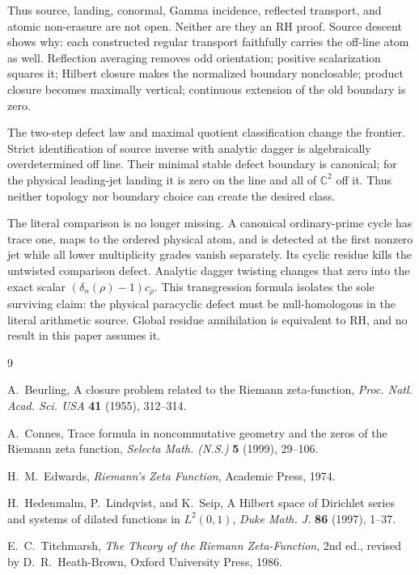 \documentclass[11pt]{article}
\theoremstyle{definition}
\theoremstyle{remark}
\newcommand{\C}{\mathbb C}
\begin{document}
Thus source, landing, conormal, Gamma incidence, reflected transport, and
atomic non-erasure are not open.  Neither are they an RH proof.  Source
descent shows why: each constructed regular transport faithfully carries the
off-line atom as well.  Reflection averaging removes odd orientation;
positive scalarization squares it; Hilbert closure makes the normalized
boundary nonclosable; product closure becomes maximally vertical; continuous
extension of the old boundary is zero.

The two-step defect law and maximal quotient classification change the
frontier.  Strict identification of source inverse with analytic dagger is
algebraically overdetermined off line.  Their minimal stable defect boundary
is canonical; for the physical leading-jet landing it is zero on the line and
all of \(\C^2\) off it.  Thus neither topology nor boundary choice can create
the desired class.

The literal comparison is no longer missing.  A canonical ordinary-prime
cycle has trace one, maps to the ordered physical atom, and is detected at
the first nonzero jet while all lower multiplicity grades vanish separately.
Its cyclic residue kills the untwisted comparison defect.  Analytic dagger
twisting changes that zero into the exact scalar
\((\delta_n(\rho)-1)c_\rho\).  This transgression formula isolates the sole
surviving claim: the physical paracyclic defect must be null-homologous in
the literal arithmetic source.  Global residue annihilation is equivalent to
RH, and no result in this paper assumes it.

\begin{thebibliography}{9}

A.~Beurling,
\newblock A closure problem related to the Riemann zeta-function,
\newblock \emph{Proc. Natl. Acad. Sci. USA} \textbf{41} (1955), 312--314.

A.~Connes,
\newblock Trace formula in noncommutative geometry and the zeros of the
Riemann zeta function,
\newblock \emph{Selecta Math. (N.S.)} \textbf{5} (1999), 29--106.

H.~M.~Edwards,
\newblock \emph{Riemann's Zeta Function},
\newblock Academic Press, 1974.

H.~Hedenmalm, P.~Lindqvist, and K.~Seip,
\newblock A Hilbert space of Dirichlet series and systems of dilated
functions in \(L^2(0,1)\),
\newblock \emph{Duke Math. J.} \textbf{86} (1997), 1--37.

E.~C.~Titchmarsh,
\newblock \emph{The Theory of the Riemann Zeta-Function}, 2nd ed.,
revised by D.~R.~Heath-Brown,
\newblock Oxford University Press, 1986.

\end{thebibliography}
\end{document}
